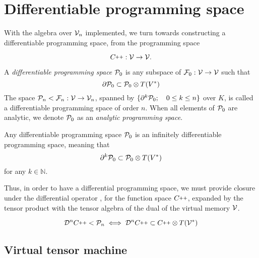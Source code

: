 \section{Differentiable programming space}\label{sec:differentiableProgSpace}

With the algebra over $\mathcal{V}_n$ implemented, we turn towards constructing a differentiable programming space, from the programming space
              
\begin{equation}
\CC:\VV\to\VV.
\end{equation}

\begin{definicija}\label{def:dP}
  A \emph{differentiable programming space} $\mathcal{P}_0$ is any subspace of $\mathcal{F}_0:\mathcal{V}\to\mathcal{V}$ such that
  \begin{equation}\label{eq:P}
  \partial\mathcal{P}_0\subset\mathcal{P}_0\otimes T(V^*)
  \end{equation}
  The space $\mathcal{P}_n<\mathcal{F}_n:\mathcal{V}\to\mathcal{V}_n$, spanned by $\{\partial^k\mathcal{P}_0;\quad 0\le k\le n\}$ over $K$, is called a differentiable programming space of order $n$. When all elements of $\mathcal{P}_0$ are analytic, we denote $\mathcal{P}_0$ as an \emph{analytic programming space}. \cite[Definition~4.2]{OperationalCalculus}
 \end{definicija}
              
\begin{izrek}\label{izr:P}
  Any differentiable programming space $\mathcal{P}_0$ is an
  infinitely differentiable programming space, meaning that
  \begin{equation}\label{eq:P_n}
      \partial^k\mathcal{P}_0\subset\mathcal{P}_0\otimes T(V^*)
    \end{equation}
for any $k\in\mathbb{N}$. \cite[Theorem~4.1]{OperationalCalculus}
\end{izrek}
              
              Thus, in order to have a differential programming space, we must provide closure under the differential operator \cite[Corollary~10]{OperationalCalculus}, for the function space $\CC$, expanded by the tensor product with the tensor algebra of the dual of the virtual memory $\mathcal{V}$.
              
              \begin{equation}
              \DD^n\CC<\dP_n\iff\DD^n\CC\subset\CC\otimes T(\VV^*)
              \end{equation}


\subsection{Virtual tensor machine}\label{sec:analyticVmachine}

